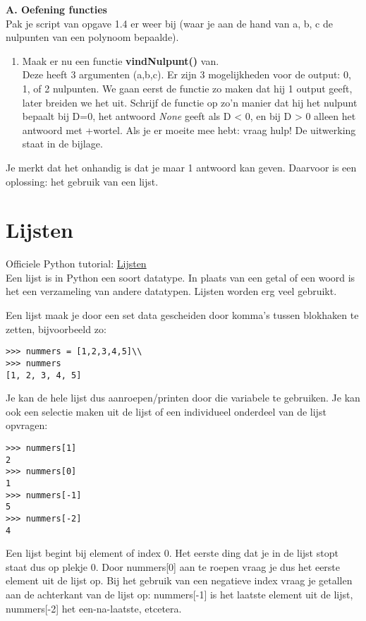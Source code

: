 \textbf{A. Oefening functies} \\
Pak je script van opgave 1.4 er weer bij (waar je aan de hand van a, b, c de nulpunten van een polynoom bepaalde).
\begin{enumerate}[label=\textbf{A.\arabic*}]
\item Maak er nu een functie \textbf{vindNulpunt()} van. 
\\Deze heeft 3 argumenten (a,b,c). Er zijn 3 mogelijkheden voor de output: 0, 1, of 2 nulpunten. We gaan eerst de functie zo maken dat hij 1 output geeft, later breiden we het uit. Schrijf de functie op zo'n manier dat hij het nulpunt bepaalt bij D=0, het antwoord \textit{None} geeft als D < 0, en bij D > 0 alleen het antwoord met +wortel. Als je er moeite mee hebt: vraag hulp! De uitwerking staat in de bijlage. 
\end{enumerate}
Je merkt dat het onhandig is dat je maar 1 antwoord kan geven. Daarvoor is een oplossing: het gebruik van een lijst.

\section{Lijsten}
Officiele Python tutorial: \href{https://docs.python.org/3/tutorial/datastructures.html
}{Lijsten} \\
Een lijst is in Python een soort datatype. In plaats van een getal of een woord is het een verzameling van andere datatypen. Lijsten worden erg veel gebruikt.

Een lijst maak je door een set data gescheiden door komma's tussen blokhaken te zetten, bijvoorbeeld zo:
\begin{lstlisting}[frame=single]
>>> nummers = [1,2,3,4,5]\\
>>> nummers
[1, 2, 3, 4, 5]
\end{lstlisting}
Je kan de hele lijst dus aanroepen/printen door die variabele te gebruiken. Je kan ook een selectie maken uit de lijst of een individueel onderdeel van de lijst opvragen:
\begin{lstlisting}[frame=single]
>>> nummers[1]
2
>>> nummers[0]
1
>>> nummers[-1]
5
>>> nummers[-2]
4
\end{lstlisting}
Een lijst begint bij element of index 0. Het eerste ding dat je in de lijst stopt staat dus op plekje 0. Door nummers[0] aan te roepen vraag je dus het eerste element uit de lijst op. Bij het gebruik van een negatieve index vraag je getallen aan de achterkant van de lijst op: nummers[-1] is het laatste element uit de lijst, nummers[-2] het een-na-laatste, etcetera.

